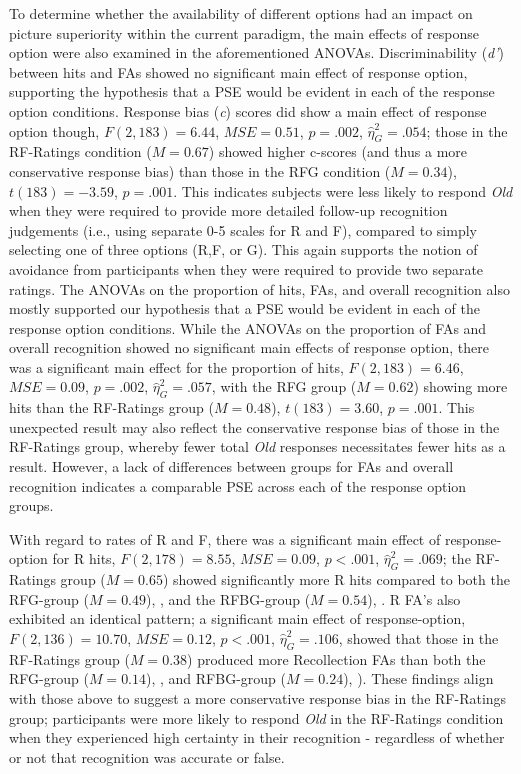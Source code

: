 \documentclass[
  11pt,
]{article}
\begin{document}
To determine whether the availability of different options had an impact
on picture superiority within the current paradigm, the main effects of
response option were also examined in the aforementioned ANOVAs.
Discriminability (\emph{d'}) between hits and FAs showed no significant
main effect of response option, supporting the hypothesis that a PSE
would be evident in each of the response option conditions. Response
bias (\emph{c}) scores did show a main effect of response option though,
\(F(2, 183) = 6.44\), \(\mathit{MSE} = 0.51\), \(p = .002\),
\(\hat{\eta}^2_G = .054\); those in the RF-Ratings condition
(\(M = 0.67\)) showed higher c-scores (and thus a more conservative
response bias) than those in the RFG condition (\(M = 0.34\)),
\(t(183) = -3.59\), \(p = .001\). This indicates subjects were less
likely to respond \emph{Old} when they were required to provide more
detailed follow-up recognition judgements (i.e., using separate 0-5
scales for R and F), compared to simply selecting one of three options
(R,F, or G). This again supports the notion of avoidance from
participants when they were required to provide two separate ratings.
The ANOVAs on the proportion of hits, FAs, and overall recognition also
mostly supported our hypothesis that a PSE would be evident in each of
the response option conditions. While the ANOVAs on the proportion of
FAs and overall recognition showed no significant main effects of
response option, there was a significant main effect for the proportion
of hits, \(F(2, 183) = 6.46\), \(\mathit{MSE} = 0.09\), \(p = .002\),
\(\hat{\eta}^2_G = .057\), with the RFG group (\(M = 0.62\)) showing
more hits than the RF-Ratings group (\(M = 0.48\)), \(t(183) = 3.60\),
\(p = .001\). This unexpected result may also reflect the conservative
response bias of those in the RF-Ratings group, whereby fewer total
\emph{Old} responses necessitates fewer hits as a result. However, a
lack of differences between groups for FAs and overall recognition
indicates a comparable PSE across each of the response option groups.

With regard to rates of R and F, there was a significant main effect of
response-option for R hits, \(F(2, 178) = 8.55\),
\(\mathit{MSE} = 0.09\), \(p < .001\), \(\hat{\eta}^2_G = .069\); the
RF-Ratings group (\(M = 0.65\)) showed significantly more R hits
compared to both the RFG-group (\(M = 0.49\)), , and the RFBG-group
(\(M = 0.54\)), . R FA's also exhibited an identical pattern; a
significant main effect of response-option, \(F(2, 136) = 10.70\),
\(\mathit{MSE} = 0.12\), \(p < .001\), \(\hat{\eta}^2_G = .106\), showed
that those in the RF-Ratings group (\(M = 0.38\)) produced more
Recollection FAs than both the RFG-group (\(M = 0.14\)), , and
RFBG-group (\(M = 0.24\)), ). These findings align with those above to
suggest a more conservative response bias in the RF-Ratings group;
participants were more likely to respond \emph{Old} in the RF-Ratings
condition when they experienced high certainty in their recognition -
regardless of whether or not that recognition was accurate or false.
\end{document}
